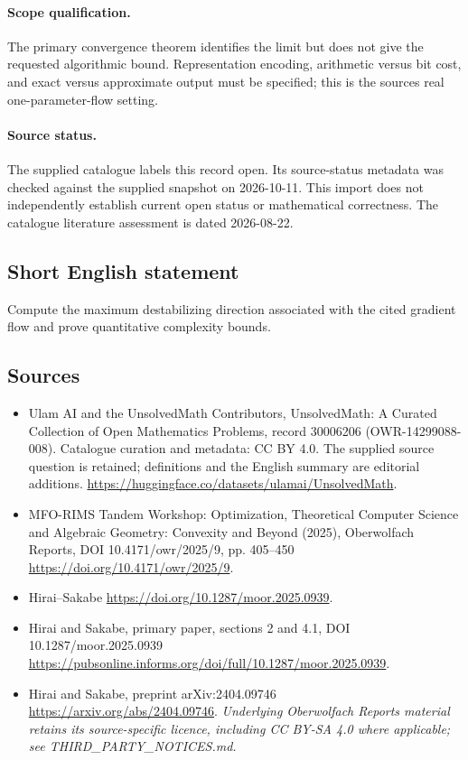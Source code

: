 \documentclass[11pt]{article}
\begin{document}
\paragraph{Scope qualification.}
The primary convergence theorem identifies the limit but does not give the requested algorithmic bound. Representation encoding, arithmetic versus bit cost, and exact versus approximate output must be specified; this is the source\textquotesingle s real one-parameter-flow setting.
\paragraph{Source status.}
The supplied catalogue labels this record open. Its source-status metadata was checked against the supplied snapshot on 2026-10-11. This import does not independently establish current open status or mathematical correctness. The catalogue literature assessment is dated 2026-08-22.
\subsection{Short English statement}
Compute the maximum destabilizing direction associated with the cited gradient flow and prove quantitative complexity bounds.
\subsection{Sources}
\begin{itemize}
\item[S1] Ulam AI and the UnsolvedMath Contributors, UnsolvedMath: A Curated Collection of Open Mathematics Problems, record 30006206 (OWR-14299088-008). Catalogue curation and metadata: CC BY 4.0. The supplied source question is retained; definitions and the English summary are editorial additions.
\url{https://huggingface.co/datasets/ulamai/UnsolvedMath}.
\item[S2] MFO-RIMS Tandem Workshop: Optimization, Theoretical Computer Science and Algebraic Geometry: Convexity and Beyond (2025), Oberwolfach Reports, DOI 10.4171/owr/2025/9, pp. 405--450
\url{https://doi.org/10.4171/owr/2025/9}.
\item[S3] Hirai--Sakabe
\url{https://doi.org/10.1287/moor.2025.0939}.
\item[S4] Hirai and Sakabe, primary paper, sections 2 and 4.1, DOI 10.1287/moor.2025.0939
\url{https://pubsonline.informs.org/doi/full/10.1287/moor.2025.0939}.
\item[S5] Hirai and Sakabe, preprint arXiv:2404.09746
\url{https://arxiv.org/abs/2404.09746}.
\textit{Underlying Oberwolfach Reports material retains its source-specific licence, including CC BY-SA 4.0 where applicable; see THIRD\_PARTY\_NOTICES.md.}
\end{itemize}
\end{document}
